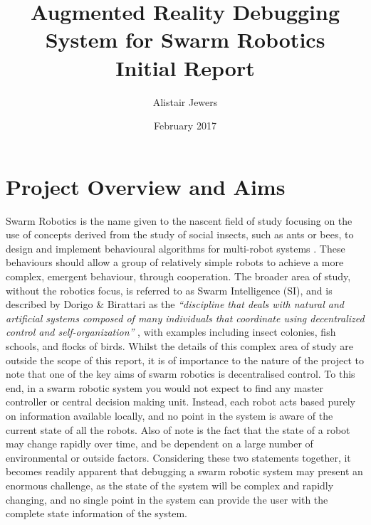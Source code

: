 \documentclass[titlepage,hidelinks,10pt]{article}
\date{February 2017}
\title{Augmented Reality Debugging System for Swarm Robotics \vspace{1cm}\\\Large{Initial Report}}
\author{Alistair Jewers}
\begin{document}
\maketitle

\tableofcontents
\newpage

\section{Project Overview and Aims} \label{Overview}
Swarm Robotics is the name given to the nascent field of study focusing on the use of concepts derived from the study of social insects, such as ants or bees, to design and implement behavioural algorithms for multi-robot systems \cite{InspirationToApplication}. These behaviours should allow a group of relatively simple robots to achieve a more complex, emergent behaviour, through cooperation. The broader area of study, without the robotics focus, is referred to as Swarm Intelligence (SI), and is described by Dorigo \& Birattari as the \textit{``discipline that deals with natural and artificial systems composed of many individuals that coordinate using decentralized control and self-organization''} \cite{SwarmIntelligence}, with examples including insect colonies, fish schools, and flocks of birds. Whilst the details of this complex area of study are outside the scope of this report, it is of importance to the nature of the project to note that one of the key aims of swarm robotics is decentralised control. To this end, in a swarm robotic system you would not expect to find any master controller or central decision making unit. Instead, each robot acts based purely on information available locally, and no point in the system is aware of the current state of all the robots. Also of note is the fact that the state of a robot may change rapidly over time, and be dependent on a large number of environmental or outside factors. Considering these two statements together, it becomes readily apparent that debugging a swarm robotic system may present an enormous challenge, as the state of the system will be complex and rapidly changing, and no single point in the system can provide the user with the complete state information of the system. 
\end{document}
